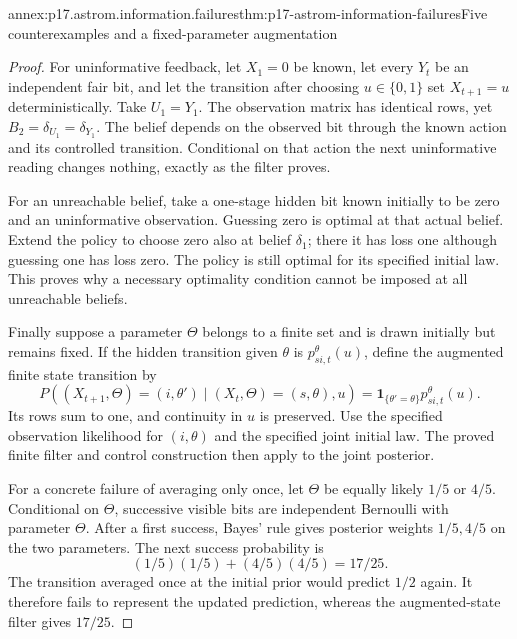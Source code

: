 \begin{annexitem}{annex:p17.astrom.information.failures}{thm:p17-astrom-information-failures}{Five counterexamples and a fixed-parameter augmentation}
\begin{proof}
For uninformative feedback, let \(X_1=0\) be known,
let every \(Y_t\) be an independent fair bit, and
let the transition after choosing \(u\in\{0,1\}\)
set \(X_{t+1}=u\) deterministically.
Take \(U_1=Y_1\). The observation matrix has identical
rows, yet \(B_2=\delta_{U_1}=\delta_{Y_1}\).
The belief depends on the observed bit through
the known action and its controlled transition.
Conditional on that action the next uninformative
reading changes nothing, exactly as the filter proves.

For an unreachable belief, take a one-stage hidden
bit known initially to be zero and an uninformative
observation. Guessing zero is optimal at that actual
belief. Extend the policy to choose zero also at
belief \(\delta_1\); there it has loss one although
guessing one has loss zero. The policy is still
optimal for its specified initial law.
This proves why a necessary optimality condition
cannot be imposed at all unreachable beliefs.

Finally suppose a parameter \(\Theta\) belongs to a
finite set and is drawn initially but remains fixed.
If the hidden transition given \(\theta\) is
\(p_{si,t}^\theta(u)\), define the augmented finite
state transition by
\[
 P((X_{t+1},\Theta)=(i,\theta')\mid(X_t,\Theta)=(s,\theta),u)
                  =\mathbf1_{\{\theta'=\theta\}}
                                      p_{si,t}^\theta(u).
\]
Its rows sum to one, and continuity in \(u\) is
preserved. Use the specified observation likelihood
for \((i,\theta)\) and the specified joint initial law.
The proved finite filter and control construction
then apply to the joint posterior.

For a concrete failure of averaging only once,
let \(\Theta\) be equally likely \(1/5\) or \(4/5\).
Conditional on \(\Theta\), successive visible bits
are independent Bernoulli with parameter \(\Theta\).
After a first success, Bayes' rule gives posterior
weights \(1/5,4/5\) on the two parameters.
The next success probability is
\[
                   (1/5)(1/5)+(4/5)(4/5)=17/25.
\]
The transition averaged once at the initial prior
would predict \(1/2\) again. It therefore fails to
represent the updated prediction, whereas the
augmented-state filter gives \(17/25\).
\end{proof}
\end{annexitem}

